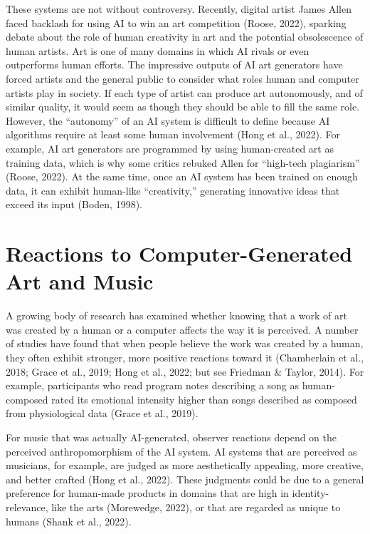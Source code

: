 \documentclass[12pt,twoside]{reedthesis}
\begin{document}
These systems are not without controversy. Recently, digital artist James Allen faced backlash for using AI to win an art competition (Roose, 2022), sparking debate about the role of human creativity in art and the potential obsolescence of human artists. Art is one of many domains in which AI rivals or even outperforms human efforts. The impressive outputs of AI art generators have forced artists and the general public to consider what roles human and computer artists play in society. If each type of artist can produce art autonomously, and of similar quality, it would seem as though they should be able to fill the same role. However, the “autonomy” of an AI system is difficult to define because AI algorithms require at least some human involvement (Hong et al., 2022). For example, AI art generators are programmed by using human-created art as training data, which is why some critics rebuked Allen for “high-tech plagiarism” (Roose, 2022). At the same time, once an AI system has been trained on enough data, it can exhibit human-like “creativity,” generating innovative ideas that exceed its input (Boden, 1998). 

\section{Reactions to Computer-Generated Art and Music
}

A growing body of research has examined whether knowing that a work of art was created by a human or a computer affects the way it is perceived. A number of studies have found that when people believe the work was created by a human, they often exhibit stronger, more positive reactions toward it (Chamberlain et al., 2018; Grace et al., 2019; Hong et al., 2022; but see Friedman \& Taylor, 2014). For example, participants who read program notes describing a song as human-composed rated its emotional intensity higher than songs described as composed from physiological data (Grace et al., 2019). 

For music that was actually AI-generated, observer reactions depend on the perceived anthropomorphism of the AI system. AI systems that are perceived as musicians, for example, are judged as more aesthetically appealing, more creative, and better crafted (Hong et al., 2022). These judgments could be due to a general preference for human-made products in domains that are high in identity-relevance, like the arts (Morewedge, 2022), or that are regarded as unique to humans (Shank et al., 2022).
\end{document}
